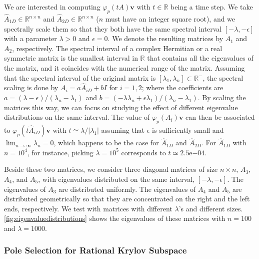 We are interested in computing $\varphi_p(tA) \mathbf{v}$ with $t \in \mathbb{R}$ being a time step.
We take $\hat{A}_{1D} \in \mathbb{R}^{n \times n}$ and $\hat{A}_{2D} \in \mathbb{R}^{n \times n}$
($n$ must have an integer square root), and we spectrally scale them so that they both have the
same spectral interval $[-\lambda, -\epsilon]$ with a parameter $\lambda > 0$ and $\epsilon = 0$.
We denote the resulting matrices by $A_1$ and $A_2$, respectively.
The spectral interval of a complex Hermitian or a real symmetric matrix is the smallest
interval in $\mathbb{R}$ that contains all the eigenvalues of the matrix, and it coincides
with the numerical range of the matrix.
Assuming that the spectral interval of the original matrix is $[\lambda_1, \lambda_n] \subset \mathbb{R^{-}}$,
the spectral scaling is done by $A_i = a \hat{A}_{iD} + b I$ for $i = 1, 2$; where the coefficients
are $a = (\lambda - \epsilon) / (\lambda_n - \lambda_1)$ and
$b = (- \lambda \lambda_n + \epsilon \lambda_1) / (\lambda_n - \lambda_1)$.
By scaling the matrices this way, we can focus on studying the effect of different eigenvalue
distributions on the same interval. The value of $\varphi_p(A_i) \mathbf{v}$ can then be
associated to $\varphi_p(t\hat{A}_{iD}) \mathbf{v}$ with $t \simeq \lambda / |\lambda_1|$ assuming that $\epsilon$
is sufficiently small and $\lim_{n \to \infty}\lambda_n = 0$,
which happens to be the case for $\hat{A}_{1D}$ and $\hat{A}_{2D}$. For $\hat{A}_{1D}$ with
$n = 10^4$, for instance, picking $\lambda = 10^5$ corresponds to $t \simeq 2.5\mathrm{e}{-04}$.


Beside these two matrices, we consider three diagonal matrices of size
$n \times n$, $A_3$, $A_4$, and $A_5$, with eigenvalues distributed on the same
interval, $[-\lambda, -\epsilon]$. The eigenvalues of $A_3$ are distributed
uniformly. The eigenvalues of $A_4$ and $A_5$ are distributed geometrically so that
they are concentrated on the right and the left ends, respectively. We test with
matrices with different $\lambda$'s and different sizes.
\autoref{fig:eigenvaluedistributions} shows the eigenvalues of these matrices with
$n=100$ and $\lambda = 1000$.

\subsubsection*{Pole Selection for Rational Krylov Subspace}

